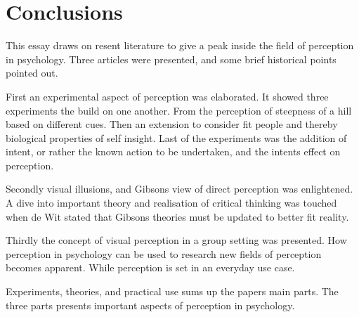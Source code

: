 \documentclass[12pt, a4paper]{article}
\begin{document}
\section{Conclusions}\label{conclusions}

This essay draws on resent literature to give a peak inside the field of
perception in psychology. Three articles were presented, and some brief
historical points pointed out.

First an experimental aspect of perception was elaborated. It showed three
experiments the build on one another. From the perception of steepness of a
hill based on different cues. Then an extension to consider fit people and
thereby biological properties of self insight. Last of the experiments was the
addition of intent, or rather the known action to be undertaken, and the
intents effect on perception. 

Secondly visual illusions, and Gibsons view of direct perception was enlightened. A dive into
important theory and realisation of critical thinking was touched when de
Wit\cite{visualillusion} stated that Gibsons theories must be updated to better
fit reality. 

Thirdly the concept of visual perception in a group setting was presented. How
perception in psychology can be used to research new fields of perception
becomes apparent. While perception is set in an everyday use case.
\cite{peopleperception} 

Experiments, theories, and practical use sums up the papers main parts.
The three parts presents important aspects of perception in psychology.
\end{document}
